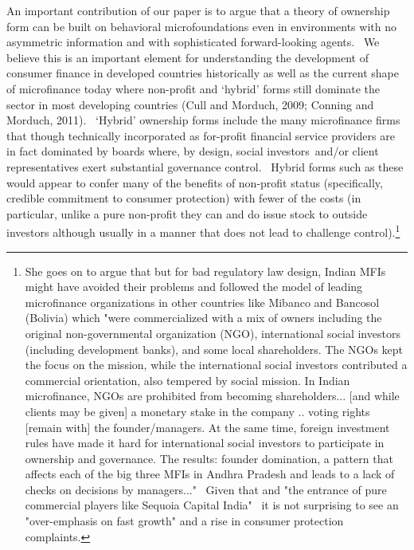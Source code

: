 \documentclass[11pt]{article}%
\begin{document}
An important contribution of our paper is to argue that a theory of ownership
form can be built on behavioral microfoundations even in environments with no
asymmetric information and with sophisticated forward-looking agents. \ We
believe this is an important element for understanding the development of
consumer finance in developed countries historically as well as the current
shape of microfinance today where non-profit and `hybrid' forms still dominate
the sector in most developing countries (Cull and Morduch, 2009; Conning and
Morduch, 2011). \ `Hybrid' ownership forms include the many microfinance firms
that though technically incorporated as for-profit financial service providers
are in fact dominated by boards where, by design, social investors\ and/or
client representatives exert substantial governance control. \ Hybrid forms
such as these would appear to confer many of the benefits of non-profit status
(specifically, credible commitment to consumer protection) with fewer of the
costs (in particular, unlike a pure non-profit they can and do issue stock to
outside investors although usually in a manner that does not lead to challenge
control).\footnote{She goes on to argue that but for bad regulatory law
design, Indian MFIs might have avoided their problems and followed the model
of leading microfinance organizations in other countries like Mibanco and
Bancosol (Bolivia) which "were commercialized with a mix of owners including
the original non-governmental organization (NGO), international social
investors (including development banks), and some local shareholders. The NGOs
kept the focus on the mission, while the international social investors
contributed a commercial orientation, also tempered by social mission. In
Indian microfinance, NGOs are prohibited from becoming shareholders... [and
while clients may be given] a monetary stake in the company .. voting rights
[remain with] the founder/managers. At the same time, foreign investment rules
have made it hard for international social investors to participate in
ownership and governance. The results: founder domination, a pattern that
affects each of the big three MFIs in Andhra Pradesh and leads to a lack of
checks on decisions by managers..." \ Given that and "the entrance of pure
commercial players like Sequoia Capital India" \ it is not surprising to see
an "over-emphasis on fast growth" and a rise in consumer protection
complaints.}
\end{document}
